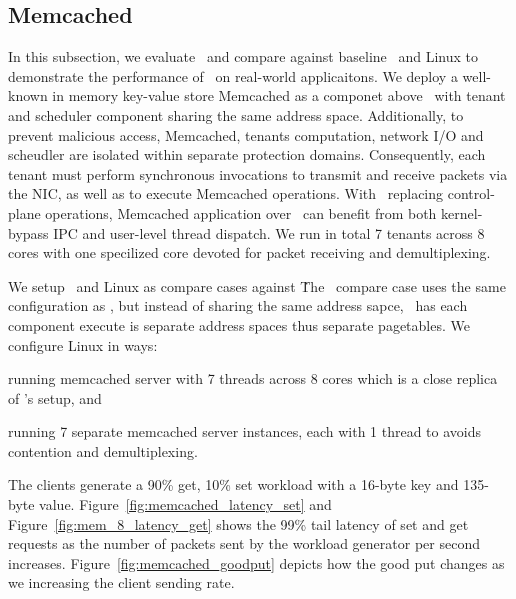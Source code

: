 \subsection{Memcached}
\label{ss:memcached}
In this subsection, we evaluate \name\ and compare against baseline \cos\ and Linux to demonstrate the performance of \name\ on real-world applicaitons.
We deploy a well-known in memory key-value store Memcached as a componet above \name\ with tenant and scheduler component sharing the same address space.
Additionally, to prevent malicious access, Memcached, tenants computation, network I/O and scheudler are isolated within separate protection domains.
Consequently, each tenant must perform synchronous invocations to transmit and receive packets via the NIC, as well as to execute Memcached operations.
With \name\ replacing control-plane operations, Memcached application over \name\ can benefit from both kernel-bypass IPC and user-level thread dispatch.
We run in total 7 tenants across 8 cores with one specilized core devoted for packet receiving and demultiplexing.

We setup \cos\ and Linux as compare cases against \name\. 
The \cos\ compare case uses the same configuration as \name , but instead of sharing the same address sapce, \cos\ has each component execute is separate address spaces thus separate pagetables.
We configure Linux in ways:
\begin{inparaenum}[(1)]
\item running memcached server with 7 threads across 8 cores which is a close replica of \name 's setup, and
\item running 7 separate memcached server instances, each with 1 thread to avoids contention and demultiplexing.
\end{inparaenum}
The clients generate a 90\% get, 10\% set workload with a 16-byte key and 135-byte value. 
Figure~\ref{fig:memcached_latency_set} and Figure~\ref{fig:mem_8_latency_get} shows the 99\% tail latency of set and get requests as the number of packets sent by the workload generator per second increases.
Figure~\ref{fig:memcached_goodput} depicts how the good put changes as we increasing the client sending rate.

